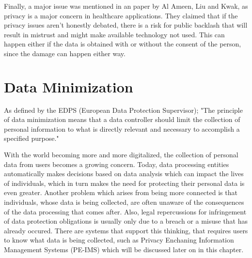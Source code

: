 Finally, a major issue was mentioned in an paper by Al Ameen, Liu and Kwak\cite{al2012security}, as privacy is a major concern in healthcare applications. They claimed that if the privacy issues aren't honestly debated, there is a risk for public backlash that will result in mistrust and might make available technology not used. This can happen either if the data is obtained with or without the consent of the person, since the damage can happen either way.






\section{Data Minimization}


As defined by the EDPS (European Data Protection Supervisor); "The principle of data minimization means that a data controller should limit the collection of personal information to what is directly relevant and necessary to accomplish a specified purpose."\cite{websiteEu} %



With the world becoming more and more digitalized, the collection of personal data from users becomes a growing concern. Today, data processing entities automatically makes decisions based on data analysis which can impact the lives of individuals, which in turn makes the need for protecting their personal data is even greater.\cite{danezis2015privacy} Another problem which arises from being more connected is that individuals, whose data is being collected, are often unaware of the consequences of the data processing that comes after. Also, legal repercussions for infringement of data protection obligations is usually only due to a breach or a misuse that has already occured. There are systems that support this thinking, that requires users to know what data is being collected, such as Privacy Enchaning Information Management Systems (PE-IMS) which will be discussed later on in this chapter. \\

